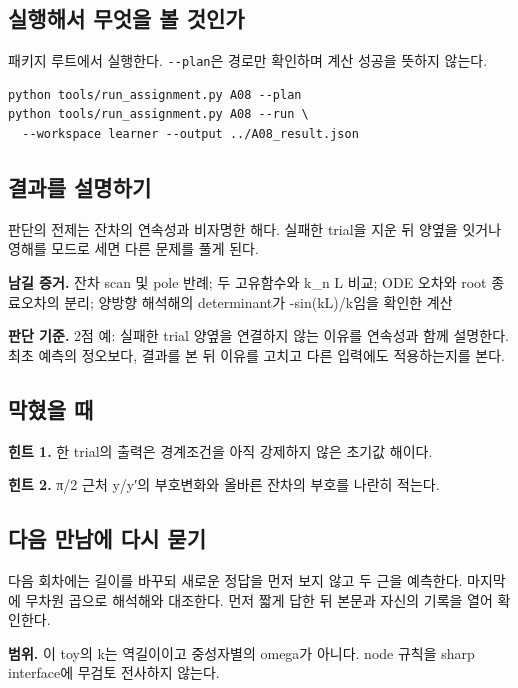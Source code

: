 \documentclass[
  10pt,
  a4paper,
]{article}
\begin{document}
\newpage

\subsection{실행해서 무엇을 볼
것인가}\label{uxc2e4uxd589uxd574uxc11c-uxbb34uxc5c7uxc744-uxbcfc-uxac83uxc778uxac00}

패키지 루트에서 실행한다. \texttt{-\/-plan}은 경로만 확인하며 계산
성공을 뜻하지 않는다.

\begin{verbatim}
python tools/run_assignment.py A08 --plan
python tools/run_assignment.py A08 --run \
  --workspace learner --output ../A08_result.json
\end{verbatim}

\subsection{결과를
설명하기}\label{uxacb0uxacfcuxb97c-uxc124uxba85uxd558uxae30}

판단의 전제는 잔차의 연속성과 비자명한 해다. 실패한 trial을 지운 뒤
양옆을 잇거나 영해를 모드로 세면 다른 문제를 풀게 된다.

\textbf{남길 증거.} 잔차 scan 및 pole 반례; 두 고유함수와 k\_n L 비교;
ODE 오차와 root 종료오차의 분리; 양방향 해석해의 determinant가
-sin(kL)/k임을 확인한 계산

\textbf{판단 기준.} 2점 예: 실패한 trial 양옆을 연결하지 않는 이유를
연속성과 함께 설명한다. 최초 예측의 정오보다, 결과를 본 뒤 이유를 고치고
다른 입력에도 적용하는지를 본다.

\subsection{막혔을 때}\label{uxb9c9uxd614uxc744-uxb54c}

\textbf{힌트 1.} 한 trial의 출력은 경계조건을 아직 강제하지 않은 초기값
해이다.

\textbf{힌트 2.} π/2 근처 y/y′의 부호변화와 올바른 잔차의 부호를 나란히
적는다.

\subsection{다음 만남에 다시
묻기}\label{uxb2e4uxc74c-uxb9ccuxb0a8uxc5d0-uxb2e4uxc2dc-uxbb3buxae30}

다음 회차에는 길이를 바꾸되 새로운 정답을 먼저 보지 않고 두 근을
예측한다. 마지막에 무차원 곱으로 해석해와 대조한다. 먼저 짧게 답한 뒤
본문과 자신의 기록을 열어 확인한다.

\textbf{범위.} 이 toy의 k는 역길이이고 중성자별의 omega가 아니다. node
규칙을 sharp interface에 무검토 전사하지 않는다.
\end{document}
